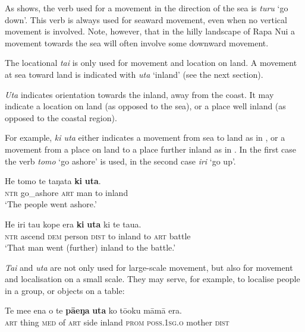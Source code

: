 As  shows, the verb used for a movement in the direction of the sea is \textit{turu} ‘go down’. This verb is always used for seaward movement, even when no vertical movement is involved. Note, however, that in the hilly landscape of Rapa Nui a movement towards the sea will often involve some downward movement.

The locational \textit{tai} is only used for movement and location on land. A movement at sea toward land is indicated with \textit{{\ꞌ}uta} ‘inland’ (see the next section).

\textit{{\ꞌ}Uta} indicates orientation towards the inland, away from the coast. It may indicate a location on land (as opposed to the sea), or a place well inland (as opposed to the coastal region).

For example, \textit{ki {\ꞌ}uta} either indicates a movement from sea to land as in , or a movement from a place on land to a place further inland as in . In the first case the verb \textit{tomo} ‘go ashore’ is used, in the second case \textit{iri} ‘go up’.

\ea\label{ex:3.162}
\gll He tomo te taŋata \textbf{ki} \textbf{{\ꞌ}uta}. \\
\textsc{ntr} go\_ashore \textsc{art} man to inland \\

\glt 
‘The people went ashore.’ \textstyleExampleref{[Ley-2-03.036]}
\z

\ea\label{ex:3.163}
\gll He iri tau kope era \textbf{ki} \textbf{{\ꞌ}uta} ki te tau{\ꞌ}a. \\
\textsc{ntr} ascend \textsc{dem} person \textsc{dist} to inland to \textsc{art} battle \\

\glt 
‘That man went (further) inland to the battle.’ \textstyleExampleref{[Mtx-7-35.012]}
\z

\textit{Tai} and \textit{{\ꞌ}uta} are not only used for large-scale movement, but also for movement and localisation on a small scale. They may serve, for example, to localise people in a group, or objects on a table:

\ea\label{ex:3.164}
\gll Te me{\ꞌ}e ena o te \textbf{pā{\ꞌ}eŋa} \textbf{{\ꞌ}uta} ko tō{\ꞌ}oku māmā era. \\
\textsc{art} thing \textsc{med} of \textsc{art} side inland \textsc{prom} \textsc{poss.1sg.o} mother \textsc{dist} \\

